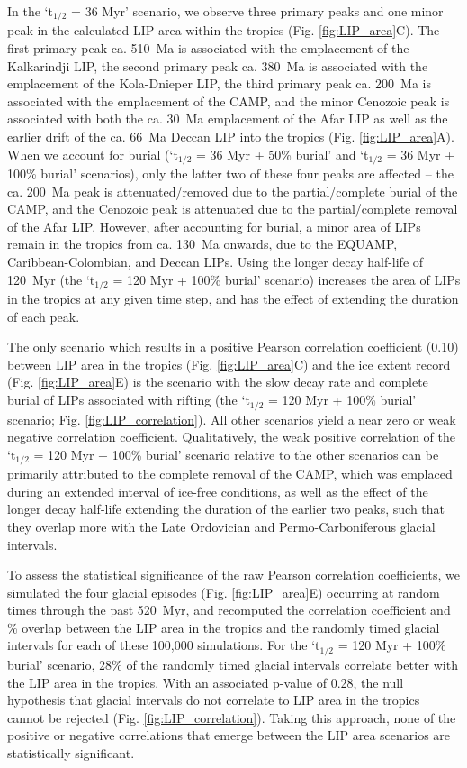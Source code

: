 \documentclass[11pt,letterpaper]{article}
\begin{document}
In the `t$_{1/2}$ = 36 Myr' scenario, we observe three primary peaks and one minor peak in the calculated LIP area within the tropics (Fig. \ref{fig:LIP_area}C). The first primary peak ca. 510~Ma is associated with the emplacement of the Kalkarindji LIP, the second primary peak ca. 380~Ma is associated with the emplacement of the Kola-Dnieper LIP, the third primary peak ca. 200~Ma is associated with the emplacement of the CAMP, and the minor Cenozoic peak is associated with both the ca. 30~Ma emplacement of the Afar LIP as well as the earlier drift of the ca. 66~Ma Deccan LIP into the tropics (Fig. \ref{fig:LIP_area}A). When we account for burial (`t$_{1/2}$ = 36 Myr + 50\% burial' and `t$_{1/2}$ = 36 Myr + 100\% burial' scenarios), only the latter two of these four peaks are affected -- the ca. 200~Ma peak is attenuated/removed due to the partial/complete burial of the CAMP, and the Cenozoic peak is attenuated due to the partial/complete removal of the Afar LIP. However, after accounting for burial, a minor area of LIPs remain in the tropics from ca. 130~Ma onwards, due to the EQUAMP, Caribbean-Colombian, and Deccan LIPs. Using the longer decay half-life of 120~Myr (the `t$_{1/2}$ = 120 Myr + 100\% burial' scenario) increases the area of LIPs in the tropics at any given time step, and has the effect of extending the duration of each peak.

The only scenario which results in a positive Pearson correlation coefficient (0.10) between LIP area in the tropics (Fig. \ref{fig:LIP_area}C) and the ice extent record (Fig. \ref{fig:LIP_area}E) is the scenario with the slow decay rate and complete burial of LIPs associated with rifting (the `t$_{1/2}$ = 120 Myr + 100\% burial' scenario; Fig. \ref{fig:LIP_correlation}). All other scenarios yield a near zero or weak negative correlation coefficient. Qualitatively, the weak positive correlation of the `t$_{1/2}$ = 120 Myr + 100\% burial' scenario relative to the other scenarios can be primarily attributed to the complete removal of the CAMP, which was emplaced during an extended interval of ice-free conditions, as well as the effect of the longer decay half-life extending the duration of the earlier two peaks, such that they overlap more with the Late Ordovician and Permo-Carboniferous glacial intervals.

To assess the statistical significance of the raw Pearson correlation coefficients, we simulated the four glacial episodes (Fig. \ref{fig:LIP_area}E) occurring at random times through the past 520~Myr, and recomputed the correlation coefficient and \% overlap between the LIP area in the tropics and the randomly timed glacial intervals for each of these 100,000 simulations.  For the `t$_{1/2}$ = 120 Myr + 100\% burial' scenario, 28\% of the randomly timed glacial intervals correlate better with the LIP area in the tropics. With an associated p-value of 0.28, the null hypothesis that glacial intervals do not correlate to LIP area in the tropics cannot be rejected (Fig. \ref{fig:LIP_correlation}). Taking this approach, none of the positive or negative correlations that emerge between the LIP area scenarios are statistically significant.
\end{document}
